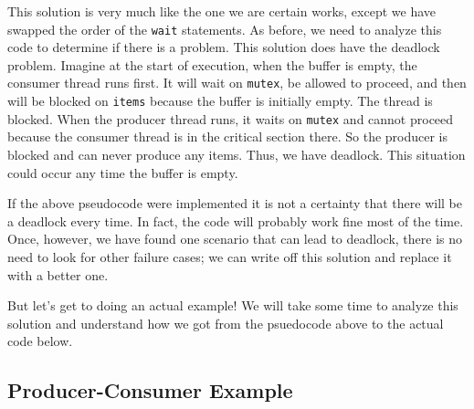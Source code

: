 This solution is very much like the one we are certain works, except we have swapped the order of the \texttt{wait} statements. As before, we need to analyze this code to determine if there is a problem. This solution does have the deadlock problem. Imagine at the start of execution, when the buffer is empty, the consumer thread runs first. It will wait on \texttt{mutex}, be allowed to proceed, and then will be blocked on \texttt{items} because the buffer is initially empty. The thread is blocked. When the producer thread runs, it waits on \texttt{mutex} and cannot proceed because the consumer thread is in the critical section there. So the producer is blocked and can never produce any items. Thus, we have deadlock. This situation could occur any time the buffer is empty.

If the above pseudocode were implemented it is not a certainty that there will be a deadlock every time. In fact, the code will probably work fine most of the time. Once, however, we have found one scenario that can lead to deadlock, there is no need to look for other failure cases; we can write off this solution and replace it with a better one.

But let's get to doing an actual example! We will take some time to analyze this solution and understand how we got from the psuedocode above to the actual code below.

\subsection*{Producer-Consumer Example}

